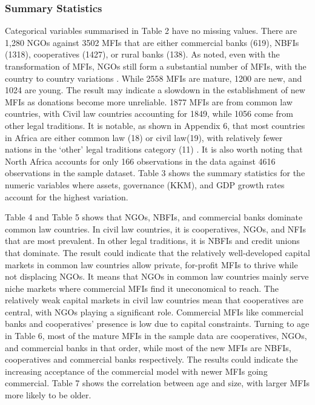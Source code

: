 \documentclass[a4paper,nobind]{templates/ociamthesis}
\begin{document}
\newpage

\hypertarget{summary-statistics}{%
\subsubsection{Summary Statistics}\label{summary-statistics}}

Categorical variables summarised in Table 2 have no missing values. There are 1,280 NGOs against 3502 MFIs that are either commercial banks (619), NBFIs (1318), cooperatives (1427), or rural banks (138). As noted, even with the transformation of MFIs, NGOs still form a substantial number of MFIs, with the country to country variations \autocite{d2017ngos}. While 2558 MFIs are mature, 1200 are new, and 1024 are young. The result may indicate a slowdown in the establishment of new MFIs as donations become more unreliable. 1877 MFIs are from common law countries, with Civil law countries accounting for 1849, while 1056 come from other legal traditions. It is notable, as shown in Appendix 6, that most countries in Africa are either common law (18) or civil law(19), with relatively fewer nations in the `other' legal traditions category (11) \autocite{oto2014distribution}. It is also worth noting that North Africa accounts for only 166 observations in the data against 4616 observations in the sample dataset. Table 3 shows the summary statistics for the numeric variables where assets, governance (KKM), and GDP growth rates account for the highest variation.

Table 4 and Table 5 shows that NGOs, NBFIs, and commercial banks dominate common law countries. In civil law countries, it is cooperatives, NGOs, and NFIs that are most prevalent. In other legal traditions, it is NBFIs and credit unions that dominate. The result could indicate that the relatively well-developed capital markets in common law countries allow private, for-profit MFIs to thrive while not displacing NGOs. It means that NGOs in common law countries mainly serve niche markets where commercial MFIs find it uneconomical to reach. The relatively weak capital markets in civil law countries mean that cooperatives are central, with NGOs playing a significant role. Commercial MFIs like commercial banks and cooperatives' presence is low due to capital constraints. Turning to age in Table 6, most of the mature MFIs in the sample data are cooperatives, NGOs, and commercial banks in that order, while most of the new MFIs are NBFIs, cooperatives and commercial banks respectively. The results could indicate the increasing acceptance of the commercial model with newer MFIs going commercial. Table 7 shows the correlation between age and size, with larger MFIs more likely to be older.
\end{document}
